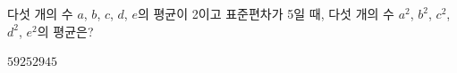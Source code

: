 다섯 개의 수 $a$, $b$, $c$, $d$, $e$의 평균이 2이고 표준편차가 5일 때, 다섯 개의 수 $a^2$, $b^2$, $c^2$, $d^2$, $e^2$의 평균은?
\begin{choices32}{$5$}{$9$}{$25$}{$29$}{$45$}\end{choices32}
